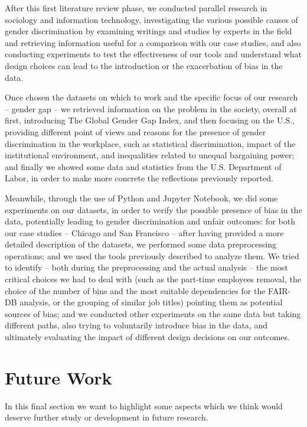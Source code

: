 After this first literature review phase, we conducted parallel research in sociology and information technology, investigating the various possible causes of gender discrimination by examining writings and studies by experts in the field and retrieving information useful for a comparison with our case studies, and also conducting experiments to test the effectiveness of our tools and understand what design choices can lead to the introduction or the exacerbation of bias in the data.

Once chosen the datasets on which to work and the specific focus of our research -- gender gap -- we retrieved information on the problem in the society, overall at first, introducing The Global Gender Gap Index, and then focusing on the U.S., providing different point of views and reasons for the presence of gender discrimination in the workplace, such as statistical discrimination, impact of the institutional environment, and inequalities related to unequal bargaining power; and finally we showed some data and statistics from the U.S. Department of Labor, in order to make more concrete the reflections previously reported.

Meanwhile, through the use of Python and Jupyter Notebook, we did some experiments on our datasets, in order to verify the possible presence of bias in the data, potentially leading to gender discrimination and unfair outcomes: for both our case studies -- Chicago and San Francisco -- after having provided a more detailed description of the datasets, we performed some data preprocessing operations; and we used the tools previously described to analyze them. We tried to identify -- both during the preprocessing and the actual analysis -- the most critical choices we had to deal with (such as the part-time employees removal, the choice of the number of bins and the most suitable dependencies for the FAIR-DB analysis, or the grouping of similar job titles) pointing them as potential sources of bias; and we conducted other experiments on the same data but taking different paths, also trying to voluntarily introduce bias in the data, and ultimately evaluating the impact of different design decisions on our outcomes.


\section{Future Work}
In this final section we want to highlight some aspects which we think would deserve further study or development in future research.


